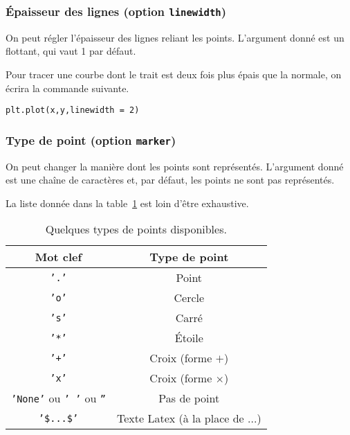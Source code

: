 \subsubsection{Épaisseur des lignes (option \texttt{linewidth})}

On peut régler l'épaisseur des lignes reliant les points.
L'argument donné est un flottant, qui vaut 1 par défaut. 

\begin{exemple}
  Pour tracer une courbe dont le trait est deux fois plus épais que la normale, on écrira la commande suivante.
\begin{lstlisting}
plt.plot(x,y,linewidth = 2)
\end{lstlisting}
\end{exemple}

\subsubsection{Type de point (option \texttt{marker})}

On peut changer la manière dont les points sont représentés. 
L'argument donné est une chaîne de caractères et, par défaut, les points ne sont pas représentés. 

\begin{rem}
  La liste donnée dans la table~\ref{tab:marker} est loin d'être exhaustive. 
\end{rem}


\begin{table}[!h]
  \begin{center}
    \begin{tabular}{|c|c|}
      \hline
      Mot clef & Type de point \\
      \hline
      \texttt{'.'} & Point \\
      \hline
      \texttt{'o'} & Cercle \\
      \hline
      \texttt{'s'} & Carré \\
      \hline
      \texttt{'*'} & Étoile \\
      \hline
      \texttt{'+'} & Croix (forme $+$) \\
      \hline
      \texttt{'x'} & Croix (forme $\times$) \\
      \hline
      \texttt{'None'} ou \texttt{' '} ou \texttt{''} & Pas de point \\
      \hline
      \texttt{'\$...\$'} & Texte Latex (à la place de ...) \\
      \hline
    \end{tabular}
    \caption{Quelques types de points disponibles.}
    \label{tab:marker}
  \end{center}
\end{table}

